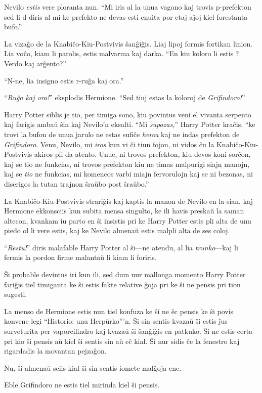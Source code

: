 Nevilo \emph{estis} vere ploranta nun. ``Mi iris al la unua vagono kaj
trovis p-prefekton sed li d-diris al mi ke prefekto ne devas esti
enuita por etaj aĵoj kiel forestanta bufo.''

La vizaĝo de la Knabiĉo-Kiu-Postvivis ŝanĝiĝis. Liaj lipoj formis
fortikan linion. Lia voĉo, kiam li parolis, estis malvarma kaj
darka. ``En kiu koloro li estis ? Verdo kaj arĝento?''

``N-ne, lia insigno estis r-ruĝa kaj ora.''

``\emph{Ruĝa kaj ora!}'' eksplodis Hermione. ``Sed tiuj estas la
koloroj de \emph{Grifindoro!}''

Harry Potter siblis je tio, per timiga sono, kiu povintus veni el
vivanta serpento kaj farigis ambaŭ ŝin kaj Nevilo'n eksalti. ``Mi
\emph{supozas,}'' Harry Potter kraĉis, ``ke trovi la bufon de unua
jarulo ne estas sufiĉe \emph{heroa} kaj ne indas prefekton de
\emph{Grifindoro}. Venu, Nevilo, mi \emph{iros} kun vi ĉi tiun fojon,
ni vidos ĉu la Knabiĉo-Kiu-Postvivis akiros pli da atento. Unue, ni
trovos prefekton, kiu devos koni sorĉon, kaj se tio ne funkcias, ni
trovos prefekton kiu ne timas malpurigi siajn manojn, kaj se
\emph{tio} ne funkcias, mi komencos varbi miajn fervorulojn kaj se ni
bezonas, ni diserigos la tutan trajnon ŝraŭbo post ŝraŭbo.''

La Knabiĉo-Kiu-Postvivis strariĝis kaj kaptis la manon de Nevilo en la
sian, kaj Hermione ekkonsciis kun subita mensa singulto, ke ili havis
preskaŭ la saman altecon, kvankam iu parto en ŝi insistis pri ke
Harry Potter estis pli alta de unu piedo ol li vere estis, kaj ke
Nevilo almenaŭ estis malpli alta de ses coloj.

``\emph{Restu!}'' diris malafable Harry Potter al ŝi—ne atendu, al lia
\emph{trunko}—kaj li fermis la pordon firme malantaŭ li kiam li
foriris.

Ŝi probable devintus iri kun ili, sed dum nur mallonga momento Harry
Potter fariĝis tiel timiganta ke ŝi estis fakte relative ĝoja pri ke
ŝi ne pensis pri tion sugesti.

La menso de Hermione estis nun tiel konfuza ke ŝi ne êc pensis ke ŝi
povis konvene legi ``Historio: unu Herpŭrko'''n. Ŝi sin sentis kvazaŭ
ŝi estis ĵus surveturita per vaporcilindro kaj kvazaŭ ŝi ŝanĝiĝis en
patkuko. Ŝi ne estis certa pri kio ŝi pensis aŭ kiel ŝi sentis sin aŭ
eĉ kial. Ŝi nur sidis ĉe la fenestro kaj rigardadis la movantan
pejzaĝon.

Nu, ŝi almenaŭ sciis kial ŝi sin sentis iomete malĝoja ene.

Eble Grifindoro ne estis tiel mirinda kiel ŝi pensis.
